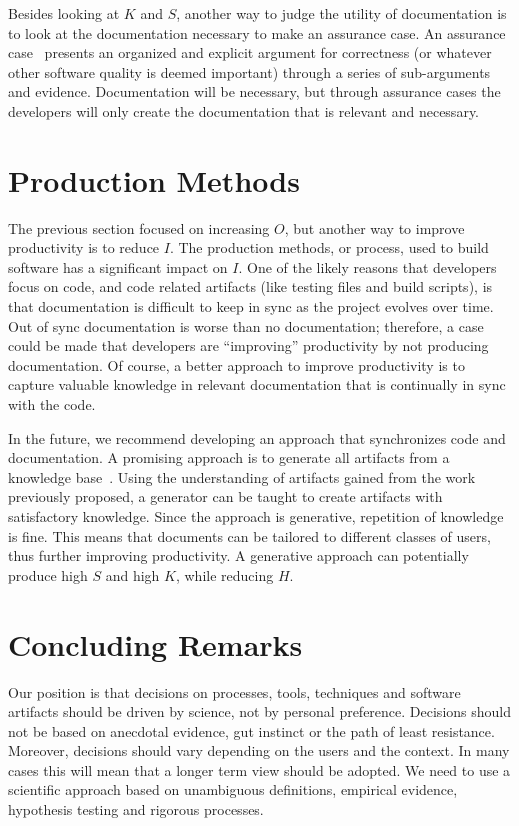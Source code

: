 \documentclass[sigconf, authorversion, nonacm]{acmart}
\begin{document}
Besides looking at $K$ and $S$, another way to judge the utility of
documentation is to look at the documentation necessary to make an assurance
case. An assurance case~\cite{RinehartEtAl2015} presents an organized and
explicit argument for correctness (or whatever other software quality is deemed
important) through a series of sub-arguments and evidence.  Documentation will
be necessary, but through assurance cases the developers will only create the
documentation that is relevant and necessary. 

\section{Production Methods}

The previous section focused on increasing $O$, but another way to improve
productivity is to reduce $I$.  The production methods, or process, used to
build software has a significant impact on $I$.  One of the likely reasons that
developers focus on code, and code related artifacts (like testing files and
build scripts), is that documentation is difficult to keep in sync as the
project evolves over time.  Out of sync documentation is worse than no
documentation; therefore, a case could be made that developers are ``improving''
productivity by not producing documentation.  Of course, a better approach to
improve productivity is to capture valuable knowledge in relevant documentation
that is continually in sync with the code.

In the future, we recommend developing an approach that synchronizes code and
documentation.  A promising approach is to generate all artifacts from a
knowledge base~\cite{SzymczakEtAl2016}.  Using the understanding of artifacts
gained from the work previously proposed, a generator can be taught to create
artifacts with satisfactory knowledge. Since the approach is generative,
repetition of knowledge is fine.  This means that documents can be tailored to
different classes of users, thus further improving productivity.  A generative
approach can potentially produce high $S$ and high $K$, while reducing $H$.

\section{Concluding Remarks}

Our position is that decisions on processes, tools, techniques and software
artifacts should be driven by science, not by personal preference.  Decisions
should not be based on anecdotal evidence, gut instinct or the path of least
resistance.  Moreover, decisions should vary depending on the users and the
context.  In many cases this will mean that a longer term view should be
adopted.  We need to use a scientific approach based on unambiguous definitions,
empirical evidence, hypothesis testing and rigorous processes.
\end{document}
